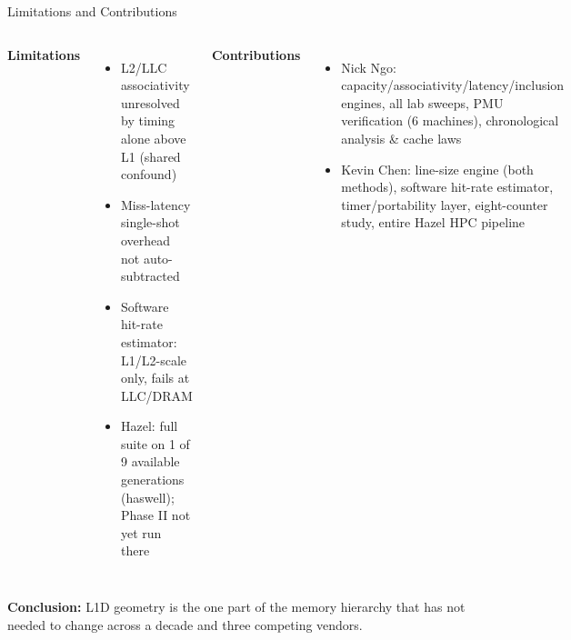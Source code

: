 \documentclass[aspectratio=169,10pt]{beamer}
\begin{document}
\begin{frame}{Limitations and Contributions}
\begin{columns}[T]
\textbf{Limitations}
\begin{itemize}
    \item L2/LLC associativity unresolved by timing alone above L1 (shared confound)
    \item Miss-latency single-shot overhead not auto-subtracted
    \item Software hit-rate estimator: L1/L2-scale only, fails at LLC/DRAM
    \item Hazel: full suite on 1 of 9 available generations (haswell); Phase II not yet run there
\end{itemize}
\textbf{Contributions}
\begin{itemize}
    \item Nick Ngo: capacity/associativity/latency/inclusion engines, all lab sweeps, PMU verification (6 machines), chronological analysis \& cache laws
    \item Kevin Chen: line-size engine (both methods), software hit-rate estimator, timer/portability layer, eight-counter study, entire Hazel HPC pipeline
\end{itemize}
\end{columns}

\bigskip
\centering\textbf{Conclusion:} L1D geometry is the one part of the memory hierarchy that
has not needed to change across a decade and three competing vendors.
\end{frame}
\end{document}
